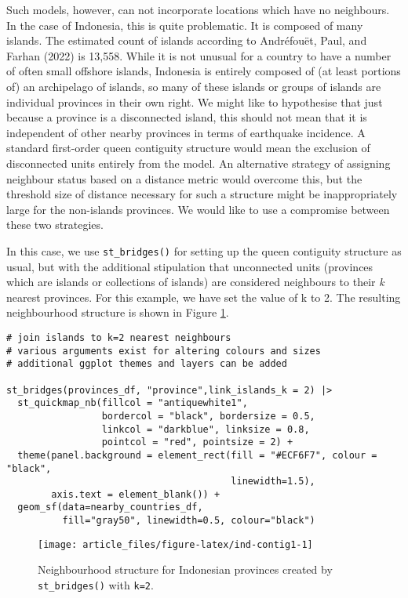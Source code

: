 Such models, however, can not incorporate locations which have no
neighbours. In the case of Indonesia, this is quite problematic. It is
composed of many islands. The estimated count of
islands according to Andréfouët, Paul, and Farhan (2022) is 13,558.
While it is not unusual for a country to have a number of often small
offshore islands, Indonesia is entirely composed of (at least portions
of) an archipelago of islands, so many of these islands or groups of
islands are individual provinces in their own right. We might like to hypothesise that just because a province is a disconnected island, this should not mean that it is independent of other nearby provinces in terms of earthquake incidence. A standard first-order queen contiguity structure would mean the exclusion of disconnected units entirely from the model. An alternative strategy of assigning neighbour status based on a distance metric would overcome this, but the threshold size of distance necessary for such a structure might be inappropriately large for the non-islands provinces. We would like to use a compromise between these two strategies.

In this case, we use \texttt{st\_bridges()} for setting up the queen contiguity
structure as usual, but with the additional stipulation that unconnected
units (provinces which are islands or collections of islands) are
considered neighbours to their \emph{k} nearest provinces. For this example,
we have set the value of k to 2. The resulting neighbourhood structure
is shown in Figure \ref{fig:ind-contig1}.



\begin{verbatim}
# join islands to k=2 nearest neighbours
# various arguments exist for altering colours and sizes
# additional ggplot themes and layers can be added

st_bridges(provinces_df, "province",link_islands_k = 2) |> 
  st_quickmap_nb(fillcol = "antiquewhite1", 
                 bordercol = "black", bordersize = 0.5, 
                 linkcol = "darkblue", linksize = 0.8, 
                 pointcol = "red", pointsize = 2) + 
  theme(panel.background = element_rect(fill = "#ECF6F7", colour = "black", 
                                        linewidth=1.5),
        axis.text = element_blank()) +
  geom_sf(data=nearby_countries_df, 
          fill="gray50", linewidth=0.5, colour="black")
\end{verbatim}

\begin{figure}

{\centering \texttt{[image: article\_files/figure-latex/ind-contig1-1]} 

}

\caption{Neighbourhood structure for Indonesian provinces created by \texttt{st\_bridges()} with \texttt{k=2}.}\label{fig:ind-contig1}
\end{figure}

